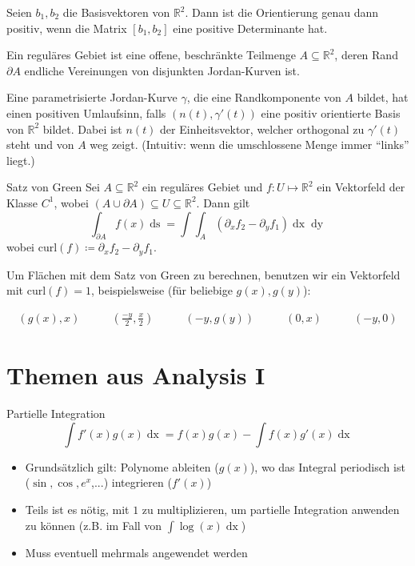 \documentclass[a4paper,10pt]{article}
\def\R{\mathbb{R}}
\def\dx{\mathop{dx}}
\def\dy{\mathop{dy}}
\begin{document}
Seien \(b_1, b_2\) die Basisvektoren von \(\R^2\). Dann ist die Orientierung genau dann positiv, wenn die Matrix \(\left[b_1, b_2\right]\) eine positive Determinante hat.

Ein reguläres Gebiet ist eine offene, beschränkte Teilmenge \(A\subseteq \R^2\), deren Rand \(\partial A\) endliche Vereinungen von disjunkten Jordan-Kurven ist.

Eine parametrisierte Jordan-Kurve \(\gamma\), die eine Randkomponente von \(A\) bildet, hat einen positiven Umlaufsinn, falls \((n(t), \gamma'(t))\) eine positiv orientierte Basis von \(\R^2\) bildet. Dabei ist \(n(t)\) der Einheitsvektor, welcher orthogonal zu \(\gamma'(t)\) steht und von \(A\) weg zeigt. (Intuitiv: wenn die umschlossene Menge immer ``links'' liegt.)

\begin{mainbox}{Satz von Green}
  Sei \(A \subseteq \R^2\) ein reguläres Gebiet und \(f: U \mapsto \R^2\) ein Vektorfeld der Klasse \(C^1\), wobei \((A \cup \partial A) \subseteq U \subseteq \R^2\). Dann gilt
  \[\int_{\partial A} f(x) \mathop{ds} = \int \int_A \left(\partial_x f_2 - \partial_y f_1 \right) \dx \dy\]
  wobei $\text{curl}(f) \coloneqq \partial_x f_2 - \partial_y f_1$.
\end{mainbox}
Um Flächen mit dem Satz von Green zu berechnen, benutzen wir ein Vektorfeld mit \(\text{curl}(f) = 1\), beispielsweise (für beliebige $g(x), g(y)$):

\begin{align*}
  (g(x), x) \quad & \quad (\frac{-y}{2}, \frac{x}{2}) \quad & \quad (-y, g(y))\quad  & \quad (0, x) \quad & \quad (-y, 0)
\end{align*}

\section{Themen aus Analysis I}
\begin{mainbox}{Partielle Integration}
 $$\int f'(x) g(x) \dx = f(x)g(x) - \int f(x) g'(x) \dx$$
\end{mainbox}
\begin{itemize}
 \item Grundsätzlich gilt: Polynome ableiten ($g(x)$), wo das Integral periodisch ist ($\sin, \cos, e^x$,...) integrieren ($f'(x)$)
 \item Teils ist es nötig, mit $1$ zu multiplizieren, um partielle Integration anwenden zu können (z.B. im Fall von $\int \log(x) \dx$)
 \item Muss eventuell mehrmals angewendet werden
\end{itemize}
\end{document}
